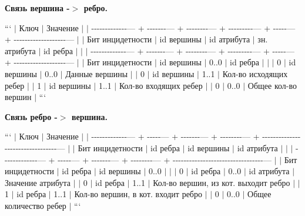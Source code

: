\begin{DoxyEnumerate}
\item {\bfseries Связь вершина -\/$>$ ребро.}

``` $\vert$ Ключ $\vert$ Значение $\vert$ $\vert$ -\/-\/-\/-\/-\/-\/-\/-\/-\/-\/-\/-\/-\/--- + -\/-\/-\/-\/-\/-\/-\/--- + -\/-\/-\/-\/-\/-\/-\/-\/--- + -\/-\/-\/-\/-\/-\/-\/-\/-\/--- + -\/-\/-\/-\/-\/--- + -\/-\/-\/-\/-\/-\/-\/-\/-\/-\/-\/-\/-\/-\/-\/-\/-\/-\/-\/--- $\vert$ $\vert$ Бит инцидетности $\vert$ id вершины $\vert$ id атрибута $\vert$ зн. атрибута $\vert$ id ребра $\vert$ $\vert$ $\vert$ -\/-\/-\/-\/-\/-\/-\/-\/-\/-\/-\/-\/-\/--- + -\/-\/-\/-\/-\/-\/-\/--- + -\/-\/-\/-\/-\/-\/-\/-\/--- + -\/-\/-\/-\/-\/-\/-\/-\/-\/--- + -\/-\/-\/-\/-\/--- + -\/-\/-\/-\/-\/-\/-\/-\/-\/-\/-\/-\/-\/-\/-\/-\/-\/-\/-\/--- $\vert$ $\vert$ Бит инцидетности $\vert$ id вершины $\vert$ 0..0 $\vert$ id ребра $\vert$ $\vert$ $\vert$ 0 $\vert$ id вершины $\vert$ 0..0 $\vert$ Данные вершины $\vert$ $\vert$ 0 $\vert$ id вершины $\vert$ 1..1 $\vert$ Кол-\/во исходящих ребер $\vert$ $\vert$ 1 $\vert$ id вершины $\vert$ 1..1 $\vert$ Кол-\/во входящих ребер $\vert$ $\vert$ 0 $\vert$ 0..0 $\vert$ Общее кол-\/во вершин $\vert$ ```
\item {\bfseries Связь ребро -\/$>$ вершина.}

``` $\vert$ Ключ $\vert$ Значение $\vert$ $\vert$ -\/-\/-\/-\/-\/-\/-\/-\/-\/-\/-\/-\/-\/--- + -\/-\/-\/-\/-\/--- + -\/-\/-\/-\/-\/-\/-\/--- + -\/-\/-\/-\/-\/-\/-\/-\/--- + -\/-\/-\/-\/-\/-\/-\/-\/-\/-\/-\/-\/-\/-\/-\/-\/-\/-\/-\/-\/-\/-\/-\/-\/-\/-\/-\/-\/-\/-\/-\/-\/-\/--- $\vert$ $\vert$ Бит инцидетности $\vert$ id ребра $\vert$ id вершины $\vert$ id атрибута $\vert$ $\vert$ $\vert$ -\/-\/-\/-\/-\/-\/-\/-\/-\/-\/-\/-\/-\/--- + -\/-\/-\/-\/-\/--- + -\/-\/-\/-\/-\/-\/-\/--- + -\/-\/-\/-\/-\/-\/-\/-\/--- + -\/-\/-\/-\/-\/-\/-\/-\/-\/-\/-\/-\/-\/-\/-\/-\/-\/-\/-\/-\/-\/-\/-\/-\/-\/-\/-\/-\/-\/-\/-\/-\/-\/--- $\vert$ $\vert$ Бит инцидетности $\vert$ id ребра $\vert$ id вершины $\vert$ 0..0 $\vert$ $\vert$ $\vert$ 0 $\vert$ id ребра $\vert$ 0..0 $\vert$ id атрибута $\vert$ Значение атрибута $\vert$ $\vert$ 0 $\vert$ id ребра $\vert$ 1..1 $\vert$ Кол-\/во вершин, из кот. выходит ребро $\vert$ $\vert$ 1 $\vert$ id ребра $\vert$ 1..1 $\vert$ Кол-\/во вершин, в кот. входит ребро $\vert$ $\vert$ 0 $\vert$ 0..0 $\vert$ Общее количество ребер $\vert$ ```
\end{DoxyEnumerate}

